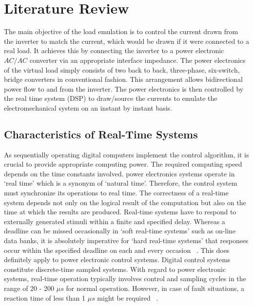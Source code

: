 \chapter{Literature Review}
The main objective of the load emulation is to control the
current drawn from the inverter to match the current,
which would be drawn if it were connected to a real
load. It achieves this by connecting the inverter to
a power electronic $AC/AC$ converter via an appropriate interface impedance. The power electronics of the virtual load
simply consists of two back to back, three-phase, six-switch, bridge converters in conventional fashion. This
arrangement allows bidirectional power flow to and
from the inverter. The power electronics is then controlled by the real time system (DSP) to draw/source the currents to emulate the electromechanical system on an instant by instant basis. 
\section{Characteristics of Real-Time Systems}
As sequentially operating digital computers implement the control algorithm, it is crucial to provide appropriate computing power. The required computing speed depends on the time constants involved. power electronics systems operate in `real time' which is a synonym of `natural time'. Therefore, the control system must synchronize its operations to real time. The correctness of a real-time system depends not only on the logical result of the computation but also on the time at which the results are produced. Real-time systems have to respond to externally generated stimuli within a finite and specified delay. Whereas a deadline can be missed occasionally in `soft real-time systems' such as on-line data banks, it is absolutely imperative for `hard real-time systems' that responses occur within the specified deadline on each and every occasion ~\cite{qing}. This does definitely apply to power electronic control systems. Digital control systems constitute discrete-time sampled systems. With regard to power electronic systems, real-time operation typically involves control and sampling cycles in the range of 20 - 200 $\mu s$ for normal operation. However, in case of fault situations, a reaction time of less than 1 $\mu s$ might be required ~\cite{mcc}.

